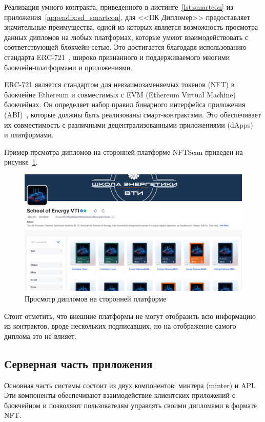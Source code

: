 Реализация умного контракта, приведенного в листинге~\ref{lst:smartcon} из приложения~\ref{appendix:sd_smartcon}, для <<ПК Дипломер>> предоставляет значительные преимущества, одной из которых является возможность просмотра данных дипломов на любых платформах, которые умеют взаимодействовать с соответствующей блокчейн-сетью. Это достигается благодаря использованию стандарта ERC-721~\cite{bib:erc721}, широко признанного и поддерживаемого многими блокчейн-платформами и приложениями.

ERC-721 является стандартом для невзаимозаменяемых токенов (NFT) в блокчейне Ethereum и совместимых с EVM (Ethereum Virtual Machine) блокчейнах. Он определяет набор правил бинарного интерфейса приложения (ABI)~\cite{bib:abi_is}, которые должны быть реализованы смарт-контрактами. Это обеспечивает их совместимость с различными децентрализованными приложениями (dApps)~\cite{bib:dapps} и платформами.

Пример прсмотра дипломов на сторонней платформе NFTScan приведен на рисунке~\ref{fig:nftscan}.

\begin{figure}[H]
	\centering
	\includegraphics[width=1\textwidth]{images/3.nftscan.png}
	\parskip=6pt
	\caption{Просмотр дипломов на сторонней платформе}
	\label{fig:nftscan}
\end{figure}

Стоит отметить, что внешние платформы не могут отобразить всю информацию из контрактов, вроде нескольких подписавших, но на отображение самого диплома это не влияет.

\subsection{Серверная часть приложения}

Основная часть системы состоит из двух компонентов: минтера (minter) и API. Эти компоненты обеспечивают взаимодействие клиентских приложений с блокчейном и позволяют пользователям управлять своими дипломами в формате NFT.

